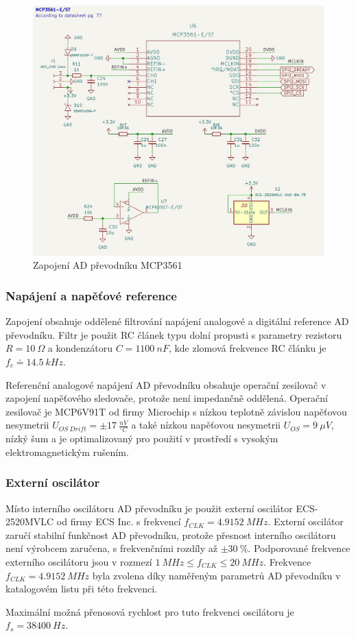 \begin{figure}[H]
    \centering
    \caption{Zapojení AD převodníku MCP3561}
    \label{fig:mcp3561_connection}
    \includegraphics[width=1\linewidth]{pictures/mcp3561_connection.jpg}
\end{figure}
\subsubsection{Napájení a napěťové reference}
Zapojení obsahuje oddělené filtrování napájení analogové a digitální reference AD převodníku. Filtr je použit RC článek typu dolní propusti s parametry rezistoru $R = 10 \ \Omega$ a kondenzátoru $C = 1100 \ nF$, kde zlomová frekvence RC článku je $f_c \doteq 14.5 \ kHz$.
\par
Referenční analogové napájení AD převodníku obsahuje operační zesilovač v zapojení napěťového sledovače, protože není impedančně oddělená. Operační zesilovač je MCP6V91T od firmy Microchip s nízkou teplotně závislou napěťovou nesymetrii $U_{OS \ Drift} = \pm 17  \ \frac{nV}{^\circ C}$
a také nízkou napěťovou nesymetrii $U_{OS} = 9 \ \mu V$, nízký šum a je optimalizovaný pro použití v prostředí s vysokým elektromagnetickým rušením.

\subsubsection{Externí oscilátor}
Místo interního oscilátoru AD převodníku je použit externí oscilátor ECS-2520MVLC od firmy ECS Inc. s frekvencí $f_{CLK} = 4.9152 \ MHz$. Externí oscilátor zaručí stabilní funkčnost AD převodníku, protože přesnost interního oscilátoru není výrobcem zaručena, s frekvenčními rozdíly až $\pm 30  \ \%$.
Podporované frekvence externího oscilátoru jsou v rozmezí $ 1 \ MHz \leq  f_{CLK} \leq 20 \ MHz $. Frekvence $f_{CLK} = 4.9152 \ MHz$ byla zvolena díky naměřeným parametrů AD převodníku v katalogovém listu při této frekvenci.
\par
Maximální možná přenosová rychlost pro tuto frekvenci oscilátoru je $f_s = 38400 \ Hz$.

